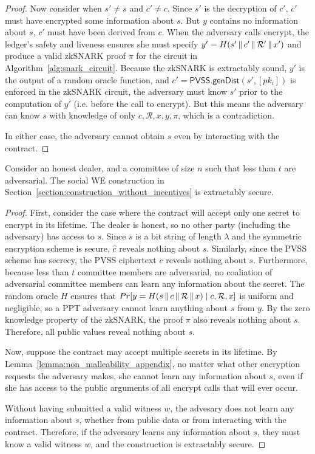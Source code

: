 \begin{proof}
    Now consider when $s' \neq s$ and $c' \neq c$.
    Since $s'$ is the decryption of $c'$, $c'$ must have encrypted some information about $s$.
    But $y$ contains no information about $s$, $c'$ must have been derived from $c$.
    When the adversary calls \textsf{encrypt}, the ledger's safety and liveness ensures she must specify $y' = H(s' \,\|\, c' \,\|\, \mathcal{R}' \,\|\, x')$ and produce a valid zkSNARK proof $\pi$ for the circuit in Algorithm~\ref{alg:snark_circuit}.
    Because the zkSNARK is extractably sound, $y'$ is the output of a random oracle function, and $c' = \textsf{PVSS.genDist}(s', [pk_i])$ is enforced in the zkSNARK circuit,
    the adversary must know $s'$ prior to the computation of $y'$ (i.e. before the call to \textsf{encrypt}).
    But this means the adversary can know $s$ with knowledge of only $c, \mathcal{R}, x, y, \pi$, which is a contradiction.

    In either case, the adversary cannot obtain $s$ even by interacting with the contract.
\end{proof}
\begin{theorem}\label{thm:security_hm_appendix}
    Consider an honest dealer, and a committee of size $n$ such that less than $t$ are adversarial.
    The social WE construction in Section~\ref{section:construction_without_incentives} is extractably secure.
\end{theorem}
\begin{proof}
    First, consider the case where the contract will accept only one secret to encrypt in its lifetime.
    The dealer is honest, so no other party (including the adversary) has access to $s$.
    Since $s$ is a bit string of length $\lambda$ and the symmetric encryption scheme is secure, $\hat{c}$ reveals nothing about $s$.
    Similarly, since the PVSS scheme has secrecy, the PVSS ciphertext $c$ reveals nothing about $s$.
    Furthermore, because less than $t$ committee members are adversarial, no coaliation of adversarial committee members can learn any information about the secret.
    The random oracle $H$ ensures that $Pr[ y = H(s \,\|\, c \,\|\, \mathcal{R} \,\|\, x) \mid c, \mathcal{R}, x ]$ is uniform and negligible, so a PPT adversary cannot learn anything about $s$ from $y$.
    By the zero knowledge property of the zkSNARK, the proof $\pi$ also reveals nothing about $s$.
    Therefore, all public values reveal nothing about $s$.

    Now, suppose the contract may accept multiple secrets in its lifetime.
    By Lemma~\ref{lemma:non_malleability_appendix}, no matter what other encryption requests the adversary makes, she cannot learn any information about $s$, even if she has access to the public arguments of all \textsf{encrypt} calls that will ever occur.

    Without having submitted a valid witness $w$, the advesary does not learn any information about $s$, whether from public data or from interacting with the contract.
    Therefore, if the adversary learns any information about $s$, they must know a valid witness $w$, and the construction is extractably secure.
\end{proof}